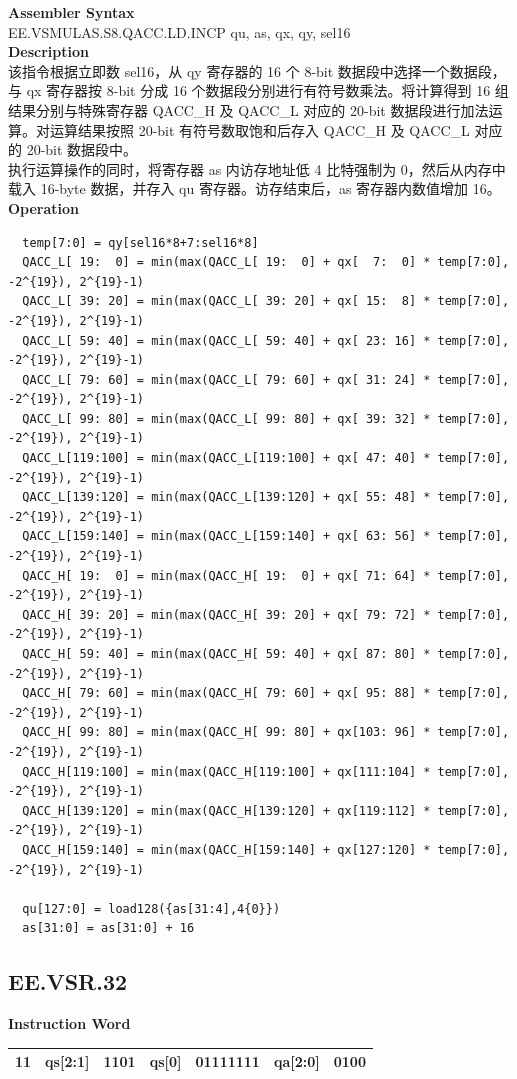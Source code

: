 \textbf{Assembler Syntax} \\
EE.VSMULAS.S8.QACC.LD.INCP qu, as, qx, qy, sel16 \\
\textbf{Description} \\
该指令根据立即数 sel16，从 qy 寄存器的 16 个 8-bit 数据段中选择一个数据段，与 qx 寄存器按 8-bit 分成 16 个数据段分别进行有符号数乘法。将计算得到 16 组结果分别与特殊寄存器 QACC\_H 及 QACC\_L 对应的 20-bit 数据段进行加法运算。对运算结果按照 20-bit 有符号数取饱和后存入 QACC\_H 及 QACC\_L 对应的 20-bit 数据段中。\\
执行运算操作的同时，将寄存器 as 内访存地址低 4 比特强制为 0，然后从内存中载入 16-byte 数据，并存入 qu 寄存器。访存结束后，as 寄存器内数值增加 16。\\
\textbf{Operation}
\begin{lstlisting}
  temp[7:0] = qy[sel16*8+7:sel16*8]
  QACC_L[ 19:  0] = min(max(QACC_L[ 19:  0] + qx[  7:  0] * temp[7:0], -2^{19}), 2^{19}-1)
  QACC_L[ 39: 20] = min(max(QACC_L[ 39: 20] + qx[ 15:  8] * temp[7:0], -2^{19}), 2^{19}-1)
  QACC_L[ 59: 40] = min(max(QACC_L[ 59: 40] + qx[ 23: 16] * temp[7:0], -2^{19}), 2^{19}-1)
  QACC_L[ 79: 60] = min(max(QACC_L[ 79: 60] + qx[ 31: 24] * temp[7:0], -2^{19}), 2^{19}-1)
  QACC_L[ 99: 80] = min(max(QACC_L[ 99: 80] + qx[ 39: 32] * temp[7:0], -2^{19}), 2^{19}-1)
  QACC_L[119:100] = min(max(QACC_L[119:100] + qx[ 47: 40] * temp[7:0], -2^{19}), 2^{19}-1)
  QACC_L[139:120] = min(max(QACC_L[139:120] + qx[ 55: 48] * temp[7:0], -2^{19}), 2^{19}-1)
  QACC_L[159:140] = min(max(QACC_L[159:140] + qx[ 63: 56] * temp[7:0], -2^{19}), 2^{19}-1)
  QACC_H[ 19:  0] = min(max(QACC_H[ 19:  0] + qx[ 71: 64] * temp[7:0], -2^{19}), 2^{19}-1)
  QACC_H[ 39: 20] = min(max(QACC_H[ 39: 20] + qx[ 79: 72] * temp[7:0], -2^{19}), 2^{19}-1)
  QACC_H[ 59: 40] = min(max(QACC_H[ 59: 40] + qx[ 87: 80] * temp[7:0], -2^{19}), 2^{19}-1)
  QACC_H[ 79: 60] = min(max(QACC_H[ 79: 60] + qx[ 95: 88] * temp[7:0], -2^{19}), 2^{19}-1)
  QACC_H[ 99: 80] = min(max(QACC_H[ 99: 80] + qx[103: 96] * temp[7:0], -2^{19}), 2^{19}-1)
  QACC_H[119:100] = min(max(QACC_H[119:100] + qx[111:104] * temp[7:0], -2^{19}), 2^{19}-1)
  QACC_H[139:120] = min(max(QACC_H[139:120] + qx[119:112] * temp[7:0], -2^{19}), 2^{19}-1)
  QACC_H[159:140] = min(max(QACC_H[159:140] + qx[127:120] * temp[7:0], -2^{19}), 2^{19}-1)

  qu[127:0] = load128({as[31:4],4{0}})
  as[31:0] = as[31:0] + 16
\end{lstlisting}

\clearpage
\subsection{EE.VSR.32}\label{instruction:EEVSR32}
\setlength\tabcolsep{6pt}
\textbf{Instruction Word} \\
\begin{tabular}{|c|c|c|c|c|c|c|}
	\hline
	11 & qs[2:1] & 1101 & qs[0] & 01111111 & qa[2:0] & 0100 \\
	\hline
\end{tabular}

